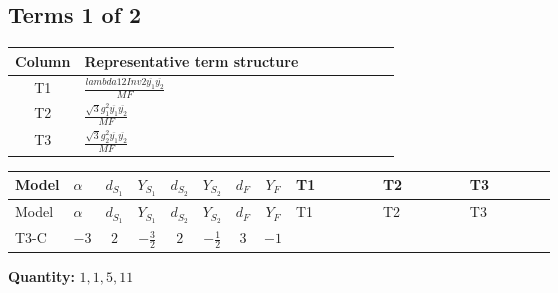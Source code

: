 \documentclass[8pt]{article}
\begin{document}
\begin{landscape}
\subsection*{Terms 1 of 2}
\begin{center}
\begin{tabular}{@{}c >{\raggedright\arraybackslash}p{0.82\linewidth}@{}}
\toprule
Column & Representative term structure \\
\midrule
T1 & \(\displaystyle \frac{lambda12Inv2 \overline{y_{1}} \overline{y_{2}}}{MF}\) \\
\midrule
T2 & \(\displaystyle \frac{\sqrt{3} g_{1}^{2} \overline{y_{1}} \overline{y_{2}}}{MF}\) \\
\midrule
T3 & \(\displaystyle \frac{\sqrt{3} g_{2}^{2} \overline{y_{1}} \overline{y_{2}}}{MF}\) \\
\midrule
\bottomrule
\end{tabular}
\end{center}
\smallskip
\tiny
\begin{longtable}{@{}llcccccc >{\raggedright\arraybackslash}p{0.21\linewidth} >{\raggedright\arraybackslash}p{0.21\linewidth} >{\raggedright\arraybackslash}p{0.21\linewidth}@{}}
\toprule
Model & $\alpha$ & $d_{S_1}$ & $Y_{S_1}$ & $d_{S_2}$ & $Y_{S_2}$ & $d_F$ & $Y_F$ & T1 & T2 & T3 \\
\midrule
\endfirsthead
\toprule
Model & $\alpha$ & $d_{S_1}$ & $Y_{S_1}$ & $d_{S_2}$ & $Y_{S_2}$ & $d_F$ & $Y_F$ & T1 & T2 & T3 \\
\midrule
\endhead
T3-C & $-3$ & $2$ & $-\frac{3}{2}$ & $2$ & $-\frac{1}{2}$ & $3$ & $-1$ & \scriptsize\adjustbox{max width=\linewidth}{$\begin{gathered} \frac{lambda12Inv2 \overline{y_{1}} \overline{y_{2}}}{3 MF}\end{gathered}$} & \scriptsize\adjustbox{max width=\linewidth}{$\begin{gathered} \frac{\sqrt{3} g_{1}^{2} \overline{y_{1}} \overline{y_{2}}}{2 MF}\end{gathered}$} & \scriptsize\adjustbox{max width=\linewidth}{$\begin{gathered} \frac{\sqrt{3} g_{2}^{2} \overline{y_{1}} \overline{y_{2}}}{4 MF}\end{gathered}$} \\
\midrule
\bottomrule
\end{longtable}
\clearpage
\noindent\textbf{Quantity: }$\mathrm{1,1,5,11}$\par\smallskip

\end{landscape}
\end{document}
